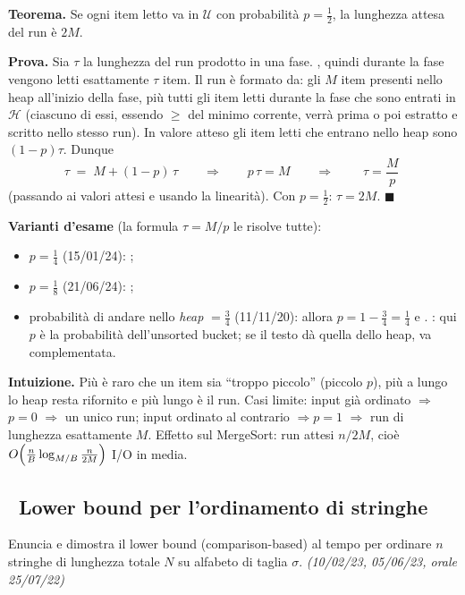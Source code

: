 \textbf{Teorema.} Se ogni item letto va in $\mathcal{U}$ con probabilit\`a $p=\tfrac12$, la
lunghezza attesa del run \`e $2M$.

\textbf{Prova.} Sia $\tau$ la lunghezza del run prodotto in una fase. , quindi durante la fase vengono letti
esattamente $\tau$ item. Il run \`e formato da: gli $M$ item presenti nello heap all'inizio della
fase, pi\`u tutti gli item letti durante la fase che sono entrati in $\mathcal{H}$ (ciascuno di
essi, essendo $\ge$ del minimo corrente, verr\`a prima o poi estratto e scritto nello stesso run).
In valore atteso gli item letti che entrano nello heap sono $(1-p)\tau$. Dunque
\[
\tau \;=\; M+(1-p)\,\tau \qquad\Longrightarrow\qquad p\,\tau=M
\qquad\Longrightarrow\qquad \boxed{\;\tau=\frac{M}{p}\;}
\]
(passando ai valori attesi e usando la linearit\`a). Con $p=\tfrac12$: $\tau=2M$. $\blacksquare$

\textbf{Varianti d'esame} (la formula $\tau=M/p$ le risolve tutte):
\begin{itemize}[leftmargin=1.6em,itemsep=1pt]
\item $p=\tfrac14$ (15/01/24): ;
\item $p=\tfrac18$ (21/06/24): ;
\item probabilit\`a di andare nello \emph{heap} $=\tfrac34$ (11/11/20): allora
$p=1-\tfrac34=\tfrac14$ e . : qui $p$ \`e la probabilit\`a
dell'unsorted bucket; se il testo d\`a quella dello heap, va complementata.
\end{itemize}
\textbf{Intuizione.} Pi\`u \`e raro che un item sia ``troppo piccolo'' (piccolo $p$), pi\`u a lungo
lo heap resta rifornito e pi\`u lungo \`e il run. Casi limite: input gi\`a ordinato $\Rightarrow$
$p=0$ $\Rightarrow$ un unico run; input ordinato al contrario $\Rightarrow p=1$ $\Rightarrow$ run
di lunghezza esattamente $M$. Effetto sul MergeSort: run attesi $n/2M$, cio\`e
$O\!\left(\frac{n}{B}\log_{M/B}\frac{n}{2M}\right)$ I/O in media.

\subsection*{\hot\ Lower bound per l'ordinamento di stringhe}

\begin{domanda}
Enuncia e dimostra il lower bound (comparison-based) al tempo per ordinare $n$ stringhe di
lunghezza totale $N$ su alfabeto di taglia $\sigma$. \emph{(10/02/23, 05/06/23, orale 25/07/22)}
\end{domanda}

